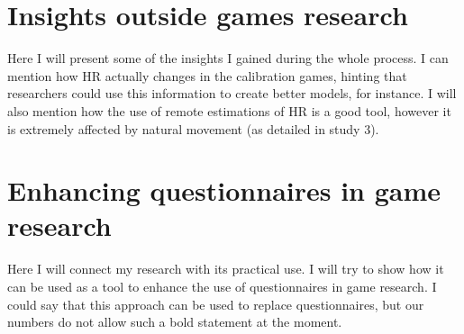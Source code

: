 \section{Insights outside games research}

Here I will present some of the insights I gained during the whole process. I can mention how HR actually changes in the calibration games, hinting that researchers could use this information to create better models, for instance. I will also mention how the use of remote estimations of HR is a good tool, however it is extremely affected by natural movement (as detailed in study 3).

\section{Enhancing questionnaires in game research}

Here I will connect my research with its practical use. I will try to show how it can be used as a tool to enhance the use of questionnaires in game research. I could say that this approach can be used to replace questionnaires, but our numbers do not allow such a bold statement at the moment.





